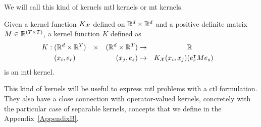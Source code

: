We will call this kind of kernels \acrshort{mtl} kernels or \acrshort{mt} kernels.
\begin{definition}\label{def:mtl_kernel}
    Given a kernel function $K_{\mathcal{X}}$ defined on $\mathbb{R}^d \times \mathbb{R}^d$ and a positive definite matrix $M \in \mathbb{R}^{(T \times T)}$, 
    a kernel function $K$ defined as
    \begin{equation}
        \nonumber
        \begin{aligned}
            K:\; & (\mathbb{R}^d \times \mathbb{R}^T) & \times &  & (\mathbb{R}^d \times \mathbb{R}^T) & \to &                     & \mathbb{R}              &   \\
                             & (x_i, e_r)                  &        &  & (x_j , e_s)      & \to & K_{\mathcal{X}}(x_i, x_j) & (e_r^\intercal M e_s) & 
        \end{aligned}
    \end{equation}
    is an \acrshort{mtl} kernel.
\end{definition}
%
This kind of kernels will be useful to express \acrshort{mtl} problems with a \acrshort{ctl} formulation.
%
They also have a close connection with operator-valued kernels, concretely with the particular case of separable kernels, concepts that we define in the Appendix~\ref{AppendixB}.

